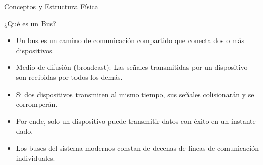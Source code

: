 \documentclass[presentation]{beamer}
\begin{document}
\begin{frame}[label={sec:org4a93e81}]{Conceptos y Estructura Física}
\begin{block}{¿Qué es un Bus?}
\begin{itemize}
\item Un \alert{bus} es un camino de comunicación compartido que conecta dos o
más dispositivos.
\item \alert{Medio de difusión (broadcast)}: Las señales transmitidas por un
dispositivo son recibidas por todos los demás.
\item Si dos dispositivos transmiten al mismo tiempo, sus señales
colisionarán y se corromperán.
\item Por ende, solo \alert{un dispositivo} puede transmitir datos con éxito en
un instante dado.
\item Los buses del sistema modernos constan de decenas de líneas de
comunicación individuales.
\end{itemize}
\end{block}
\end{frame}
\end{document}
